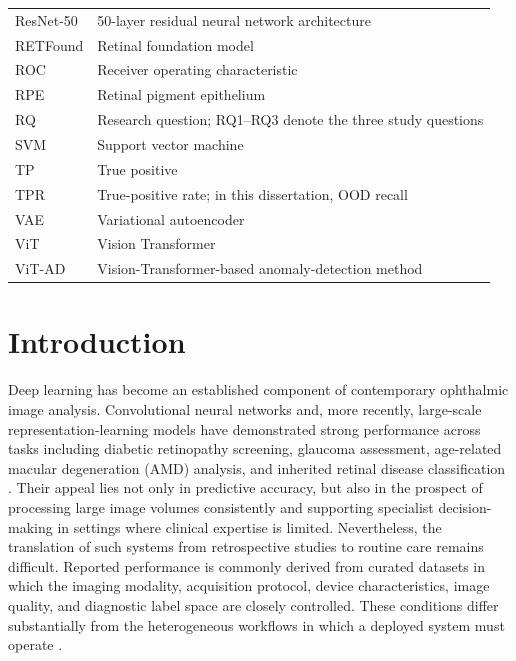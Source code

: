 \documentclass[fleqn,12pt]{olplainarticle}
\begin{document}
\begin{longtable}{@{}p{}p{}@{}}
    ResNet-50
    & 50-layer residual neural network architecture \\

    RETFound
    & Retinal foundation model \\

    ROC
    & Receiver operating characteristic \\

    RPE
    & Retinal pigment epithelium \\

    RQ
    & Research question; RQ1--RQ3 denote the three study questions \\

    SVM
    & Support vector machine \\

    TP
    & True positive \\

    TPR
    & True-positive rate; in this dissertation, OOD recall \\

    VAE
    & Variational autoencoder \\

    ViT
    & Vision Transformer \\

    ViT-AD
    & Vision-Transformer-based anomaly-detection method \\

\end{longtable}


\clearpage

\setcounter{page}{1}


\section{Introduction}
\label{sec:intro}

Deep learning has become an established component of contemporary ophthalmic image analysis. Convolutional neural networks and, more recently, large-scale representation-learning models have demonstrated strong performance across tasks including diabetic retinopathy screening, glaucoma assessment, age-related macular degeneration (AMD) analysis, and inherited retinal disease classification \cite{litjens2017survey,ting2019ophthalmology,pontikos2025next}. Their appeal lies not only in predictive accuracy, but also in the prospect of processing large image volumes consistently and supporting specialist decision-making in settings where clinical expertise is limited. Nevertheless, the translation of such systems from retrospective studies to routine care remains difficult. Reported performance is commonly derived from curated datasets in which the imaging modality, acquisition protocol, device characteristics, image quality, and diagnostic label space are closely controlled. These conditions differ substantially from the heterogeneous workflows in which a deployed system must operate \cite{kelly2019clinicalimpact,varoquaux2022medicalimaging}.
\end{document}
